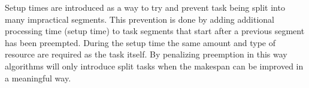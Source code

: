 Setup times are introduced as a way to try and prevent task being split into many impractical segments. This prevention is done by adding additional processing time (setup time) to task segments that start after a previous segment has been preempted. During the setup time the same amount and type of resource are required as the task itself. By penalizing preemption in this way algorithms will only introduce split tasks when the makespan can be improved in a meaningful way.
